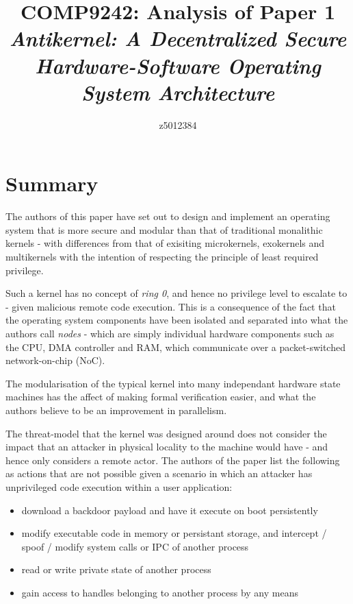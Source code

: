 \documentclass{article}
\begin{document}
\title{COMP9242: Analysis of Paper 1 \\ \vspace{0.75cm} \large \textit{Antikernel: A Decentralized Secure Hardware-Software Operating System Architecture}}

\author{z5012384}

\maketitle

\section*{Summary}
The authors of this paper have set out to design and implement an operating system that is more secure and modular than that of traditional monalithic kernels - with differences from that of exisiting microkernels, exokernels and multikernels with the intention of respecting the principle of least required privilege.

Such a kernel has no concept of \textit{ring 0}, and hence no privilege level to escalate to - given malicious remote code execution. This is a consequence of the fact that the operating system components have been isolated and separated into what the authors call \textit{nodes} - which are simply individual hardware components such as the CPU, DMA controller and RAM, which communicate over a packet-switched network-on-chip (NoC).

The modularisation of the typical kernel into many independant hardware state machines has the affect of making formal verification easier, and what the authors believe to be an improvement in parallelism.

The threat-model that the kernel was designed around does not consider the impact that an attacker in physical locality to the machine would have - and hence only considers a remote actor. The authors of the paper list the following as actions that are not possible given a scenario in which an attacker has unprivileged code execution within a user application:
\begin{itemize}
\item download a backdoor payload and have it execute on boot persistently
\item modify executable code in memory or persistant storage, and intercept / spoof / modify system calls or IPC of another process
\item read or write private state of another process
\item gain access to handles belonging to another process by any means
\end{itemize}
\end{document}
